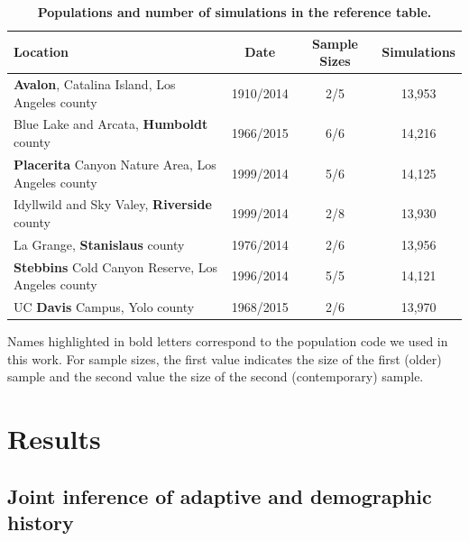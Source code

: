 \documentclass[a4paper, 12pt]{article}
\begin{document}
\begin{table}[!ht]
\small
 \caption{\textbf{Populations and number of simulations in the reference table.}}
  \centering
  \begin{tabular}{lccc}
   \cmidrule(r){1-4}
    Location                                                  &Date      &Sample Sizes   &Simulations \\
    \midrule               
    \textbf{Avalon}, Catalina Island, Los Angeles county      &1910/2014 &2/5 &13,953      \\ 
    Blue Lake and Arcata, \textbf{Humboldt} county            &1966/2015 &6/6 &14,216      \\ 
    \textbf{Placerita} Canyon Nature Area, Los Angeles county &1999/2014 &5/6 &14,125      \\ 
    Idyllwild and Sky Valey, \textbf{Riverside} county        &1999/2014 &2/8 &13,930      \\ 
    La Grange, \textbf{Stanislaus} county                     &1976/2014 &2/6 &13,956      \\ 
    \textbf{Stebbins} Cold Canyon Reserve, Los Angeles county &1996/2014 &5/5 &14,121      \\ 
    UC \textbf{Davis} Campus, Yolo county                     &1968/2015 &2/6 &13,970      \\ 
    \bottomrule
  \end{tabular}
  \begin{tablenotes}
      \footnotesize
      \item Names highlighted in bold letters correspond to the population code we used in this work. For sample sizes, the first value indicates the size of the first (older) sample and the second value the size of the second (contemporary) sample.
  
  \end{tablenotes}
  \label{tab:feralbees}
\end{table}



\section*{Results}

\subsection*{Joint inference of adaptive and demographic history}
\end{document}
